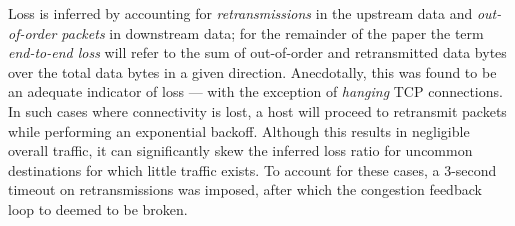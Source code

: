 
Loss is inferred by accounting for \emph{retransmissions} in the upstream data and \emph{out-of-order packets} in downstream data; for the remainder of the paper the term \emph{end-to-end loss} will refer to the sum of out-of-order and retransmitted data bytes over the total data bytes in a given direction.
Anecdotally, this was found to be an adequate indicator of loss --- with the exception of \emph{hanging} \ac{TCP} connections. 
In such cases where connectivity is lost, a host will proceed to retransmit packets while performing an exponential backoff. 
Although this results in negligible overall traffic, it can significantly skew the inferred loss ratio for uncommon destinations for which little traffic exists. 
To account for these cases, a 3-second timeout on retransmissions was imposed, after which the congestion feedback loop to deemed to be broken. 

